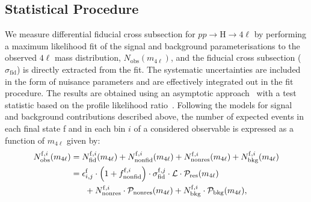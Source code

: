 
\subsection{Statistical Procedure}

%
We measure differential fiducial cross subsection for $pp\to$H$\to4\ell$ by performing a maximum likelihood fit of the signal and background parameterisations to the observed $4\ell$ mass distribution, $N_{\mathrm{obs}}(m_{4\ell})$, and the fiducial cross subsection ($\sigma_{\mathrm{fid}}$) is directly extracted from the fit. The systematic uncertainties are included in the form of nuisance parameters and are effectively integrated out in the fit procedure. The results are obtained using an asymptotic approach~\cite{LHC-HCG} with a test statistic based on the profile likelihood ratio~\cite{Cowan:2010js}. 
%
Following the models for signal and background contributions described above, the number of expected events in each final state f and in each bin $i$ of a considered observable is expressed as a function of $m_{4\ell}$ given by: 
\begin{eqnarray}
\label{eqn:m4l}
\begin{aligned}
N_{\mathrm{obs}}^{\mathrm{f},i}(m_{4\ell}) &= N_{\mathrm{fid}}^{\mathrm{f},i}(m_{4\ell})+N_{\mathrm{nonfid}}^{\mathrm{f},i}(m_{4\ell})+N_{\mathrm{nonres}}^{\mathrm{f},i}(m_{4\ell})+N_{\mathrm{bkg}}^{\mathrm{f},i}(m_{4\ell}) \\
&=\epsilon_{i,j}^{\mathrm{f}} \cdot \left(1+f_{\rm nonfid}^{\mathrm{f},i} \right)\cdot\sigma_{\mathrm{fid}}^{\mathrm{f},j} \cdot \mathcal{L}\cdot\mathcal{P}_{\mathrm{res}}(m_{4\ell}) \\
&~~~~~+ N_{\mathrm{nonres}}^{\mathrm{f},i}\cdot\mathcal{P}_{\mathrm{nonres}}(m_{4\ell})+N_{\mathrm{bkg}}^{\mathrm{f},i}\cdot\mathcal{P}_{\mathrm{bkg}}(m_{4\ell}),
\end{aligned}
\end{eqnarray}

